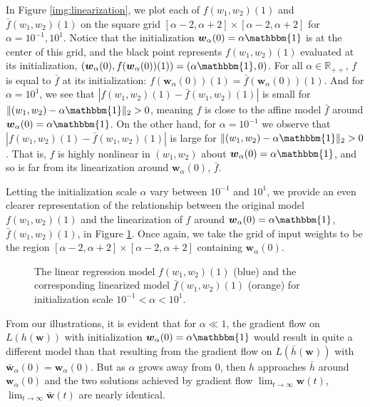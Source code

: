 \documentclass{article}
\begin{document}
In Figure \ref{img:linearization}, we plot each of $f(w_1, w_2)(1)$ and $\bar{f}(w_1, w_2)(1)$ on the square grid $[\alpha - 2, \alpha + 2] \times [\alpha - 2, \alpha + 2]$ for $\alpha = 10^{-1}, 10^1$. Notice that the initialization $\boldsymbol{w}_{\alpha}(0) = \alpha \mathbbm{1}$ is at the center of this grid, and the black point represents $f(w_1, w_2)(1)$ evaluated at its initialization, $(\boldsymbol{w}_{\alpha}(0), f(\boldsymbol{w}_{\alpha}(0))(1)) = (\alpha \mathbbm{1}, 0)$. For all $\alpha \in \mathbb{R}_{++}$, $f$ is equal to $\bar{f}$ at its initialization: $f(\boldsymbol{w}_{\alpha}(0))(1) = \bar{f}(\boldsymbol{w}_{\alpha}(0))(1)$. And for $\alpha = 10^1$, we see that $|f(w_1, w_2)(1) - \bar{f}(w_1, w_2)(1) |$ is small for $\| (w_1, w_2) - \alpha \mathbbm{1} \|_2 > 0$, meaning $f$ is close to the affine model $\bar{f}$ around $\boldsymbol{w}_{\alpha}(0) = \alpha \mathbbm{1}$. On the other hand, for $\alpha = 10^{-1}$ we observe that $|f(w_1, w_2)(1) - \bar{f}(w_1, w_2)(1)|$ is large for $\| (w_1, w_2) - \alpha \mathbbm{1} \|_2 > 0$. That is, $f$ is highly nonlinear in $(w_1, w_2)$ about $\boldsymbol{w}_{\alpha}(0) = \alpha \mathbbm{1}$, and so is far from its linearization around $\boldsymbol{w}_{\alpha}(0)$, $\bar{f}$.

Letting the initialization scale $\alpha$ vary between $10^{-1}$ and $10^{1}$, we provide an even clearer representation of the relationship between the original model $f(w_1, w_2)(1)$ and the linearization of $f$ around $\boldsymbol{w}_{\alpha}(0) = \alpha \mathbbm{1}$, $\bar{f}(w_1, w_2)(1)$, in Figure \ref{gif:linearization}. Once again, we take the grid of input weights to be the region $[\alpha - 2, \alpha + 2] \times [\alpha - 2, \alpha + 2]$ containing $\boldsymbol{w}_{\alpha}(0)$.

\begin{figure}[H]
\caption{The linear regression model $f(w_1, w_2)(1)$ (blue) and the corresponding linearized model $\bar{f}(w_1, w_2)(1)$ (orange) for initialization scale $10^{-1} < \alpha < 10^1$.}\label{gif:linearization}
\end{figure}

From our illustrations, it is evident that for $\alpha \ll 1$, the gradient flow on $L(h(\boldsymbol{w}))$ with initialization $\boldsymbol{w}_{\alpha}(0) = \alpha \mathbbm{1}$ would result in quite a different model than that resulting from the gradient flow on $L(\bar{h}(\boldsymbol{w}))$ with $\boldsymbol{\bar{w}}_{\alpha}(0) = \boldsymbol{w}_{\alpha}(0)$. But as $\alpha$ grows away from $0$, then $h$ approaches $\bar{h}$ around $\boldsymbol{w}_{\alpha}(0)$ and the two solutions achieved by gradient flow $\lim_{t \to \infty} \boldsymbol{w}(t)$,  $\lim_{t \to \infty} \boldsymbol{\bar{w}}(t)$ are nearly identical.
\end{document}

